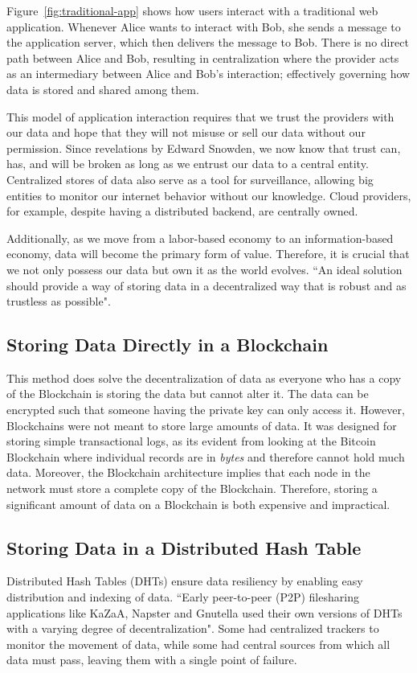 	Figure~\ref{fig:traditional-app} shows how users interact with a traditional web application. Whenever Alice wants to interact with Bob, she sends a message to the application server, which then delivers the message to Bob. There is no direct path between Alice and Bob, resulting in centralization where the provider acts as an intermediary between Alice and Bob's interaction; effectively governing how data is stored and shared among them.
	
	This model of application interaction requires that we trust the providers with our data and hope that they will not misuse or sell our data without our permission. Since revelations by Edward Snowden\cite{greenwald2014no}, we now know that trust can, has, and will be broken as long as we entrust our data to a central entity\cite{raval2016decentralized}. Centralized stores of data also serve as a tool for surveillance, allowing big entities to monitor our internet behavior without our knowledge. Cloud providers, for example,  despite having a distributed backend, are centrally owned.
	
	Additionally, as we move from a labor-based economy to an information-based economy, data will become the primary form of value. Therefore, it is crucial that we not only possess our data but own it as the world evolves. ``An ideal solution should provide a way of storing data in a decentralized way that is robust and as trustless as possible"\cite{raval2016decentralized}.
	
	\subsection{Storing Data Directly in a Blockchain}
		This method does solve the decentralization of data as everyone who has a copy of the Blockchain is storing the data but cannot alter it. The data can be encrypted such that someone having the private key can only access it. However, Blockchains were not meant to store large amounts of data. It was designed for storing simple transactional logs, as its evident from looking at the Bitcoin Blockchain where individual records are in \textit{bytes}\cite{wiki:transaction} and therefore cannot hold much data. Moreover, the Blockchain architecture implies that each node in the network must store a complete copy of the Blockchain. Therefore, storing a significant amount of data on a Blockchain is both expensive and impractical.
		
	\subsection{Storing Data in a Distributed Hash Table}
		Distributed Hash Tables (DHTs) ensure data resiliency by enabling easy distribution and indexing of data. ``Early peer-to-peer (P2P) filesharing applications like KaZaA\cite{good2003usability}, Napster\cite{ku2002creative} and Gnutella\cite{ripeanu2002mapping} used their own versions of DHTs with a varying degree of decentralization"\cite{raval2016decentralized}. Some had centralized trackers to monitor the movement of data, while some had central sources from which all data must pass, leaving them with a single point of failure\cite{raval2016decentralized}.
		
